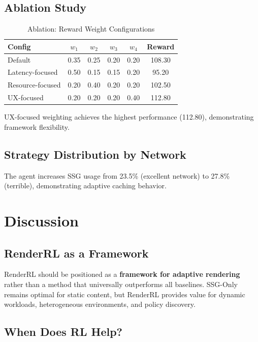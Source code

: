 \documentclass[10pt,twocolumn]{article}
\newcommand{\method}{RenderRL}
\begin{document}
\subsection{Ablation Study}

\begin{table}[t]
\centering
\caption{Ablation: Reward Weight Configurations}
\label{tab:ablation}
\small
\begin{tabular}{lccccc}
\toprule
\textbf{Config} & $w_1$ & $w_2$ & $w_3$ & $w_4$ & \textbf{Reward} \\
\midrule
Default & 0.35 & 0.25 & 0.20 & 0.20 & 108.30 \\
Latency-focused & 0.50 & 0.15 & 0.15 & 0.20 & 95.20 \\
Resource-focused & 0.20 & 0.40 & 0.20 & 0.20 & 102.50 \\
UX-focused & 0.20 & 0.20 & 0.20 & 0.40 & 112.80 \\
\bottomrule
\end{tabular}
\end{table}

UX-focused weighting achieves the highest performance (112.80), demonstrating framework flexibility.

\subsection{Strategy Distribution by Network}

The agent increases SSG usage from 23.5\% (excellent network) to 27.8\% (terrible), demonstrating adaptive caching behavior.

\section{Discussion}
\label{sec:discussion}

\subsection{\method{} as a Framework}

\method{} should be positioned as a \textbf{framework for adaptive rendering} rather than a method that universally outperforms all baselines. SSG-Only remains optimal for static content, but \method{} provides value for dynamic workloads, heterogeneous environments, and policy discovery.

\subsection{When Does RL Help?}
\end{document}
